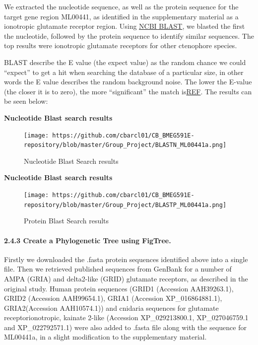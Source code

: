 \documentclass[
]{article}
\begin{document}
We extracted the nucleotide sequence, as well as the protein sequence
for the target gene region ML00441, as identified in the supplementary
material as a ionotropic glutamate receptor region. Using
\href{https://blast.ncbi.nlm.nih.gov/Blast.cgi}{NCBI BLAST}, we blasted
the first the nucleotide, followed by the protein sequence to identify
similar sequences. The top results were ionotropic glutamate receptors
for other ctenophore species.

BLAST describe the E value (the expect value) as the random chance we
could ``expect'' to get a hit when searching the database of a
particular size, in other words the E value describes the random
background noise. The lower the E-value (the closer it is to zero), the
more ``significant'' the match
is\href{https://blast.ncbi.nlm.nih.gov/Blast.cgi?CMD=Web\&PAGE_TYPE=BlastDocs\&DOC_TYPE=FAQ\#:~:text=The\%20Expect\%20value\%20(E)\%20is,describes\%20the\%20random\%20background\%20noise}{REF}.
The results can be seen below:

\textbf{Nucleotide Blast search results}

\begin{figure}
\centering
\texttt{[image: https://github.com/cbarcl01/CB\_BMEG591E-repository/blob/master/Group\_Project/BLASTN\_ML00441a.png]}
\caption{Nucleotide Blast Search results}
\end{figure}

\textbf{Nucleotide Blast search results}

\begin{figure}
\centering
\texttt{[image: https://github.com/cbarcl01/CB\_BMEG591E-repository/blob/master/Group\_Project/BLASTP\_ML00441a.png]}
\caption{Protein Blast Search results}
\end{figure}

\hypertarget{create-a-phylogenetic-tree-using-figtree.}{%
\paragraph{2.4.3 Create a Phylogenetic Tree using
FigTree.}\label{create-a-phylogenetic-tree-using-figtree.}}

Firstly we downloaded the .fasta protein sequences identified above into
a single file. Then we retrieved published sequences from GenBank for a
number of AMPA (GRIA) and delta2-like (GRID) glutamate receptors, as
described in the original study. Human protein sequences (GRID1
(Accession AAH39263.1), GRID2 (Accession AAH99654.1), GRIA1 (Accession
XP\_016864881.1), GRIA2(Accession AAH10574.1)) and cnidaria sequences
for glutamate receptorionotropic, kainate 2-like (Accession
XP\_029213800.1, XP\_027046759.1 and XP\_022792571.1) were also added to
.fasta file along with the sequence for ML00441a, in a slight
modification to the supplementary material.
\end{document}
